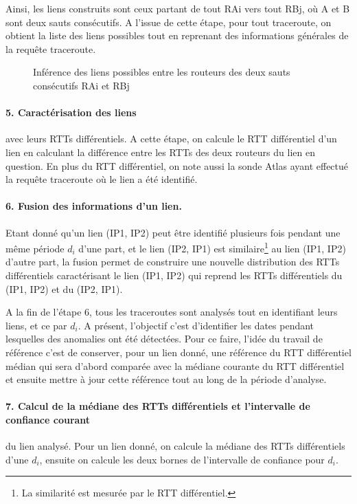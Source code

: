 Ainsi, les liens  construits sont ceux partant de tout RAi vers tout RBj, où A et B sont deux sauts consécutifs. A l'issue de cette étape, pour tout traceroute, on obtient la liste des liens possibles tout en reprenant des informations générales de la requête traceroute.
\begin{figure}[H]
	\centering
	\captionsetup{justification=centering}
	
	\caption{Inférence des liens possibles entre les routeurs des deux sauts consécutifs RAi et RBj}
	\label{fig:link-inference}
\end{figure}
\paragraph{5. Caractérisation des liens} avec leurs RTTs différentiels. A cette étape, on calcule le RTT différentiel d'un lien en calculant la différence entre les RTTs des deux routeurs du lien en question. En plus du RTT différentiel, on note aussi la sonde Atlas ayant effectué la requête traceroute où le lien a été identifié. 

\paragraph{6. Fusion des informations d'un lien. } Etant donné qu'un lien (IP1, IP2) peut être identifié plusieurs fois pendant une même période $d_i$ d'une part, et le lien (IP2, IP1) est similaire\footnote{La similarité est mesurée par le RTT différentiel.} au lien  (IP1, IP2) d'autre part, la fusion permet de construire une nouvelle distribution des RTTs différentiels caractérisant le lien (IP1, IP2) qui reprend les RTTs différentiels du (IP1, IP2) et du (IP2, IP1).


A la fin de l'étape 6, tous les traceroutes sont analysés tout en identifiant leurs liens, et ce par $d_i$. A présent, l'objectif c'est d'identifier les dates pendant lesquelles des anomalies ont été détectées. Pour ce faire, l'idée du travail de référence c'est de conserver, pour un lien donné, une référence du RTT différentiel médian qui sera d'abord comparée avec la médiane courante du RTT différentiel et ensuite mettre à jour cette référence tout au long de la période d'analyse.

  
  \paragraph{7. Calcul de la médiane des RTTs différentiels et   l'intervalle de confiance courant} du lien analysé. Pour un lien donné, on calcule la médiane des RTTs différentiels d'une $d_i$, ensuite on calcule les deux bornes de l'intervalle de confiance pour $d_i$.
  
